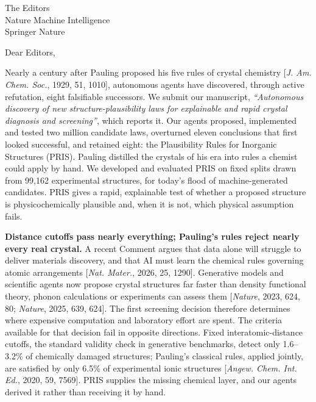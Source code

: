 \documentclass[11pt,a4paper]{letter}
\date{\hfill August 24, 2026}
\begin{document}
\sloppy

\begin{letter}{The Editors\\Nature Machine Intelligence\\Springer Nature}

\opening{Dear Editors,}

Nearly a century after Pauling proposed his five rules of crystal chemistry [\emph{J. Am. Chem. Soc.}, 1929, 51, 1010], autonomous agents have discovered, through active refutation, eight falsifiable successors. We submit our manuscript, \emph{``Autonomous discovery of new structure-plausibility laws for explainable and rapid crystal diagnosis and screening''}, which reports it. Our agents proposed, implemented and tested two million candidate laws, overturned eleven conclusions that first looked successful, and retained eight: the Plausibility Rules for Inorganic Structures (PRIS). Pauling distilled the crystals of his era into rules a chemist could apply by hand. We developed and evaluated PRIS on fixed splits drawn from 99{,}162 experimental structures, for today's flood of machine-generated candidates. PRIS gives a rapid, explainable test of whether a proposed structure is physicochemically plausible and, when it is not, which physical assumption fails.

\textbf{Distance cutoffs pass nearly everything; Pauling's rules reject nearly every real crystal.}
A recent Comment argues that data alone will struggle to deliver materials discovery, and that AI must learn the chemical rules governing atomic arrangements [\emph{Nat. Mater.}, 2026, 25, 1290]. Generative models and scientific agents now propose crystal structures far faster than density functional theory, phonon calculations or experiments can assess them [\emph{Nature}, 2023, 624, 80; \emph{Nature}, 2025, 639, 624]. The first screening decision therefore determines where expensive computation and laboratory effort are spent. The criteria available for that decision fail in opposite directions. Fixed interatomic-distance cutoffs, the standard validity check in generative benchmarks, detect only 1.6--3.2\% of chemically damaged structures; Pauling's classical rules, applied jointly, are satisfied by only 6.5\% of experimental ionic structures [\emph{Angew. Chem. Int. Ed.}, 2020, 59, 7569]. PRIS supplies the missing chemical layer, and our agents derived it rather than receiving it by hand.


\end{letter}
\end{document}
